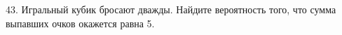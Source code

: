 43. Игральный кубик бросают дважды. Найдите вероятность того, что сумма выпавших очков окажется равна 5.\\
